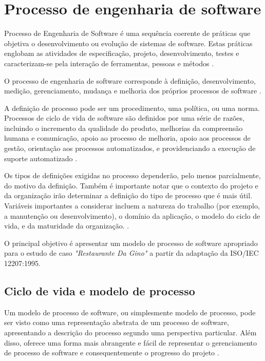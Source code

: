\chapter{Processo de engenharia de software}
\label{cap:processoengenharia}

Processo de Engenharia de Software é uma sequência coerente de práticas que objetiva o desenvolvimento ou evolução de sistemas de software. Estas práticas englobam as atividades de especificação, projeto, desenvolvimento, testes e caracterizam-se pela interação de ferramentas, pessoas e métodos \cite{engsoftiki:17}.

O processo de engenharia de software corresponde à definição, desenvolvimento, medição, gerenciamento, mudança e melhoria dos próprios processos de software \cite{SWEBOK2004}.

A definição de processo pode ser um procedimento, uma política, ou uma norma. Processos de ciclo de vida de software são definidos por uma série de razões, incluindo o incremento da qualidade do produto, melhorias da compreensão humana e comunicação, apoio ao processo de melhoria, apoio aos processos de gestão, orientação aos processos automatizados, e providenciando a execução de suporte automatizado \cite{SWEBOK2004}. 

Os tipos de definições exigidas no processo dependerão, pelo menos parcialmente, do motivo da definição. Também é importante notar que o contexto do projeto e da organização irão determinar a definição do tipo de processo que é mais útil. Variáveis importantes a considerar incluem a natureza do trabalho (por exemplo, a manutenção ou desenvolvimento), o domínio da aplicação, o modelo do ciclo de vida, e da maturidade da organização. \cite{SWEBOK2004}.

O principal objetivo é apresentar um modelo de processo de software apropriado para o estudo de caso \textit{"Restaurante Da Gino"} a partir da adaptação da ISO/IEC 12207:1995.

\section{Ciclo de vida e modelo de processo}
\label{sec:modelodeprocesso}

Um modelo de processo de software, ou simplesmente modelo de processo, pode ser visto como uma representação abstrata de um processo de software, apresentando a descrição do processo segundo uma perspectiva particular. Além disso, oferece uma forma mais abrangente e fácil de representar o gerenciamento de processo de software e consequentemente o progresso do projeto \cite{engsoftiki:17}.

